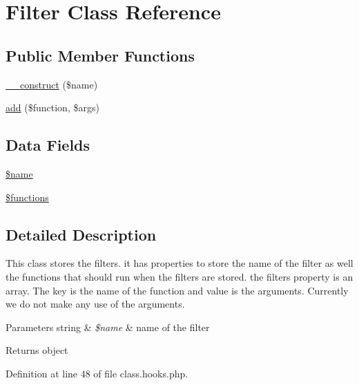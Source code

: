 \hypertarget{class_filter}{\section{Filter Class Reference}
\label{class_filter}
}
\subsection*{Public Member Functions}
\begin{DoxyCompactItemize}
\item 
\hyperlink{class_filter_a4717bbfc70a40a57ee741ed70766c309}{\-\_\-\-\_\-construct} (\$name)
\item 
\hyperlink{class_filter_a90cbfdb2d91157a1f2e94fcab3d220b3}{add} (\$function, \$args)
\end{DoxyCompactItemize}
\subsection*{Data Fields}
\begin{DoxyCompactItemize}
\item 
\hyperlink{class_filter_ab2fc40d43824ea3e1ce5d86dee0d763b}{\$name}
\item 
\hyperlink{class_filter_aa75daea491817f3b64daa2f51128bcdf}{\$functions}
\end{DoxyCompactItemize}


\subsection{Detailed Description}
This class stores the filters. it has properties to store the name of the filter as well the functions that should run when the filters are stored. the filters property is an array. The key is the name of the function and value is the arguments. Currently we do not make any use of the arguments.


\begin{DoxyParams}[1]{Parameters}
string & {\em \$name} & name of the filter \\
\hline
\end{DoxyParams}
\begin{DoxyReturn}{Returns}
object 
\end{DoxyReturn}


Definition at line 48 of file class.\-hooks.\-php.



